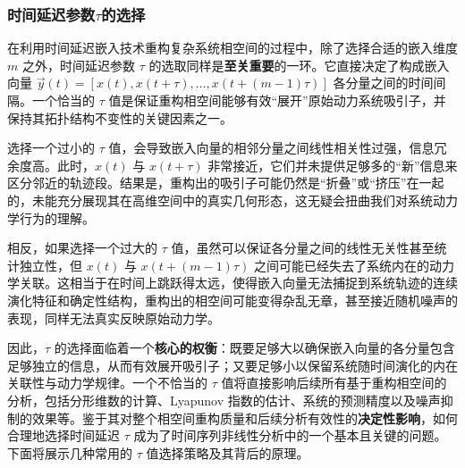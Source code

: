 \subsubsection{时间延迟参数$\tau$的选择}


在利用时间延迟嵌入技术重构复杂系统相空间的过程中，除了选择合适的嵌入维度 $m$ 之外，时间延迟参数 $\tau$ 的选取同样是\textbf{至关重要}的一环。它直接决定了构成嵌入向量 $\vec{y}(t) = [x(t), x(t+\tau), \dots, x(t+(m-1)\tau)]$ 各分量之间的时间间隔。一个恰当的 $\tau$ 值是保证重构相空间能够有效“展开”原始动力系统吸引子，并保持其拓扑结构不变性的关键因素之一。

选择一个过小的 $\tau$ 值，会导致嵌入向量的相邻分量之间线性相关性过强，信息冗余度高。此时，$x(t)$ 与 $x(t+\tau)$ 非常接近，它们并未提供足够多的“新”信息来区分邻近的轨迹段。结果是，重构出的吸引子可能仍然是“折叠”或“挤压”在一起的，未能充分展现其在高维空间中的真实几何形态，这无疑会扭曲我们对系统动力学行为的理解。

相反，如果选择一个过大的 $\tau$ 值，虽然可以保证各分量之间的线性无关性甚至统计独立性，但 $x(t)$ 与 $x(t+(m-1)\tau)$ 之间可能已经失去了系统内在的动力学关联。这相当于在时间上跳跃得太远，使得嵌入向量无法捕捉到系统轨迹的连续演化特征和确定性结构，重构出的相空间可能变得杂乱无章，甚至接近随机噪声的表现，同样无法真实反映原始动力学。

因此，$\tau$ 的选择面临着一个\textbf{核心的权衡}：既要足够大以确保嵌入向量的各分量包含足够独立的信息，从而有效展开吸引子；又要足够小以保留系统随时间演化的内在关联性与动力学规律。一个不恰当的 $\tau$ 值将直接影响后续所有基于重构相空间的分析，包括分形维数的计算、Lyapunov 指数的估计、系统的预测精度以及噪声抑制的效果等。鉴于其对整个相空间重构质量和后续分析有效性的\textbf{决定性影响}，如何合理地选择时间延迟 $\tau$ 成为了时间序列非线性分析中的一个基本且关键的问题。下面将展示几种常用的 $\tau$ 值选择策略及其背后的原理。


